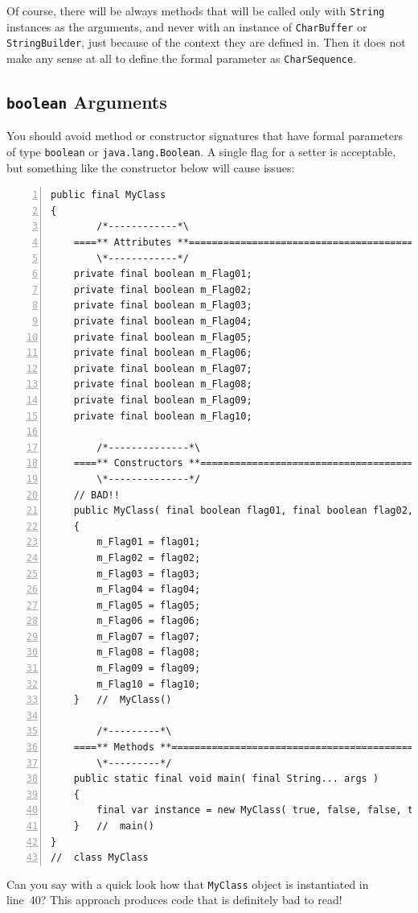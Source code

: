 \documentclass[11pt,a4paper, titlepage, parskip=half, headsepline, footsepline, cleardoublepage=current, headheight=1cm]{scrbook}
\begin{document}
Of course, there will be always methods that will be called only with \lstinline|String| instances as the arguments, and  never with an instance of \lstinline|CharBuffer|\autocite{ORACLE_DOC_CHARBUFFER_CLASS} or \lstinline|StringBuilder|\autocite{ORACLE_DOC_STRINGBUILDER_CLASS}, just because of the context they are defined in. Then it does not make any sense at all to define the formal parameter as \lstinline|CharSequence|.

\subsection{\lstinline|boolean| Arguments}\label{sec:BooleanArguments}
You should avoid method or constructor signatures that have formal parameters of type \lstinline|boolean| or \lstinline|java.lang.Boolean|. A single flag for a setter is acceptable, but something like the constructor below will cause issues:
\begin{lstlisting}[numbers=left]
public final MyClass
{
        /*------------*\
    ====** Attributes **=============================================    
        \*------------*/
    private final boolean m_Flag01;
    private final boolean m_Flag02;
    private final boolean m_Flag03;
    private final boolean m_Flag04;
    private final boolean m_Flag05;
    private final boolean m_Flag06;
    private final boolean m_Flag07;
    private final boolean m_Flag08;
    private final boolean m_Flag09;
    private final boolean m_Flag10;
    
        /*--------------*\
    ====** Constructors **===========================================
        \*--------------*/
    // BAD!!
    public MyClass( final boolean flag01, final boolean flag02, final boolean flag03, final boolean flag04, final boolean flag05, final boolean flag06, final boolean flag07, final boolean flag08, final boolean flag09 final boolean flag10 )
    {
        m_Flag01 = flag01;
        m_Flag02 = flag02;
        m_Flag03 = flag03;
        m_Flag04 = flag04;
        m_Flag05 = flag05;
        m_Flag06 = flag06;
        m_Flag07 = flag07;
        m_Flag08 = flag08;
        m_Flag09 = flag09;
        m_Flag10 = flag10;
    }   //  MyClass()
    
        /*---------*\
    ====** Methods **================================================
        \*---------*/
    public static final void main( final String... args )
    {
        final var instance = new MyClass( true, false, false, true, false, true, false, true, false, false );
    }   //  main()
}
//  class MyClass
\end{lstlisting}
Can you say with a quick look how that \lstinline|MyClass| object is instantiated in line~40? This approach produces code that is definitely bad to read!
\end{document}
